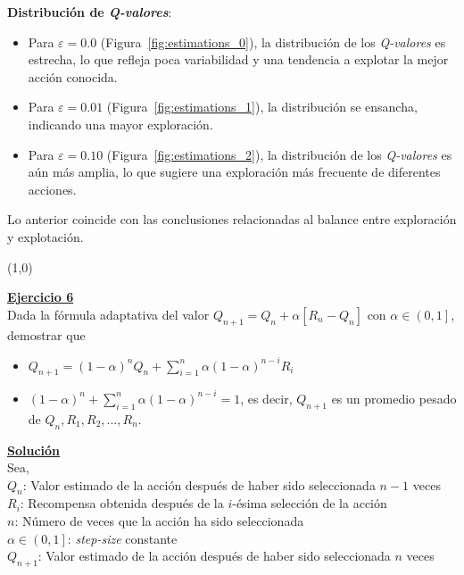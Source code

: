 \documentclass[12pt]{article}
\newlength\tindent
\renewcommand{\indent}{\hspace*{\tindent}}
\begin{document}
    \textbf{Distribución de \textit{Q-valores}}:

    \begin{itemize}
        \item Para $\varepsilon = 0.0$ (Figura~\ref{fig:estimations_0}), la distribución de los \textit{Q-valores} es estrecha, lo que refleja poca variabilidad y una tendencia a explotar la mejor acción conocida.
        \item Para $\varepsilon = 0.01$ (Figura~\ref{fig:estimations_1}), la distribución se ensancha, indicando una mayor exploración.
        \item Para $\varepsilon = 0.10$ (Figura~\ref{fig:estimations_2}), la distribución de los \textit{Q-valores} es aún más amplia, lo que sugiere una exploración más frecuente de diferentes acciones.
    \end{itemize}

    Lo anterior coincide con las conclusiones relacionadas al balance entre exploración y explotación.

    \line(1,0){\textwidth}

    \indent\underline{\textbf{Ejercicio 6}}\\
    Dada la fórmula adaptativa del valor $Q_{n+1}= Q_n+\alpha\left[R_{n}-Q_{n}\right]$ con $\alpha\in\left(0,1\right]$, demostrar que

    \begin{itemize}
        \item $Q_{n+1}=(1-\alpha)^{n}Q_{n} + \sum_{i=1}^n \alpha(1-\alpha)^{n-i}R_{i}$
        \item $(1-\alpha)^{n}+\sum_{i=1}^{n} \alpha(1-\alpha)^{n-i}=1$, es decir, $Q_{n+1}$ es un promedio pesado de $Q_{n},R_1,R_2,\dots,R_n$.
    \end{itemize}

    \indent\underline{\textbf{Solución}}\\

    Sea,\\
    $Q_{n}$: Valor estimado de la acción después de haber sido seleccionada $n-1$ veces \\
    $R_i$: Recompensa obtenida después de la $i$-ésima selección de la acción \\
    $n$: Número de veces que la acción ha sido seleccionada \\
    $\alpha\in\left(0,1\right]$: \textit{step-size} constante \\
    $Q_{n+1}$: Valor estimado de la acción después de haber sido seleccionada $n$ veces \\
\end{document}
